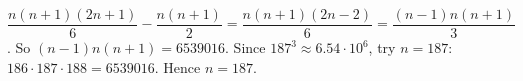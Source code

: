 $\dfrac{n(n+1)(2n+1)}{6}-\dfrac{n(n+1)}{2}=\dfrac{n(n+1)(2n-2)}{6}=\dfrac{(n-1)n(n+1)}{3}$. So $(n-1)n(n+1)=6539016$. Since $187^3\approx6.54\cdot10^6$, try $n=187$: $186\cdot187\cdot188=6539016$. Hence $n=\boxed{187}$.

